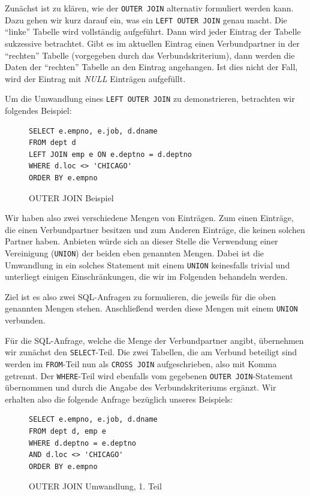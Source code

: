 Zunächst ist zu klären, wie der \verb|OUTER JOIN| alternativ formuliert werden kann. Dazu gehen wir kurz darauf ein, was ein \verb|LEFT OUTER JOIN| genau macht. Die ``linke'' Tabelle wird vollständig aufgeführt. Dann wird jeder Eintrag der Tabelle sukzessive betrachtet. Gibt es im aktuellen Eintrag einen Verbundpartner in der ``rechten'' Tabelle (vorgegeben durch das Verbundskriterium), dann werden die Daten der ``rechten'' Tabelle an den Eintrag angehangen. Ist dies nicht der Fall, wird der Eintrag mit \textit{NULL} Einträgen aufgefüllt. 

Um die Umwandlung eines \verb|LEFT OUTER JOIN| zu demonstrieren, betrachten wir folgendes Beispiel:

\begin{figure}[H]
\begin{verbatim}
SELECT e.empno, e.job, d.dname 
FROM dept d 
LEFT JOIN emp e ON e.deptno = d.deptno 
WHERE d.loc <> 'CHICAGO'
ORDER BY e.empno
\end{verbatim}
\caption{OUTER JOIN Beispiel}
\end{figure}

Wir haben also zwei verschiedene Mengen von Einträgen. Zum einen Einträge, die einen Verbundpartner besitzen und zum Anderen Einträge, die keinen solchen Partner haben. Anbieten würde sich an dieser Stelle die Verwendung einer Vereinigung (\verb|UNION|) der beiden eben genannten Mengen. Dabei ist die Umwandlung in ein solches Statement mit einem \verb|UNION| keinesfalls trivial und unterliegt einigen Einschränkungen, die wir im Folgenden behandeln werden. 

Ziel ist es also zwei SQL-Anfragen zu formulieren, die jeweils für die oben genannten Mengen stehen. Anschließend werden diese Mengen mit einem \verb|UNION| verbunden.

Für die SQL-Anfrage, welche die Menge der Verbundpartner angibt, übernehmen wir zunächst den \verb|SELECT|-Teil. Die zwei Tabellen, die am Verbund beteiligt sind werden im \verb|FROM|-Teil nun als \verb|CROSS JOIN| aufgeschrieben, also mit Komma getrennt. Der \verb|WHERE|-Teil wird ebenfalls vom gegebenen \verb|OUTER JOIN|-Statement übernommen und durch die Angabe des Verbundskriteriums ergänzt.
Wir erhalten also die folgende Anfrage bezüglich unseres Beispiels:

\begin{figure}[H]
\begin{verbatim}
SELECT e.empno, e.job, d.dname 
FROM dept d, emp e
WHERE d.deptno = e.deptno
AND d.loc <> 'CHICAGO'
ORDER BY e.empno
\end{verbatim}
\caption{OUTER JOIN Umwandlung, 1. Teil}
\end{figure}

